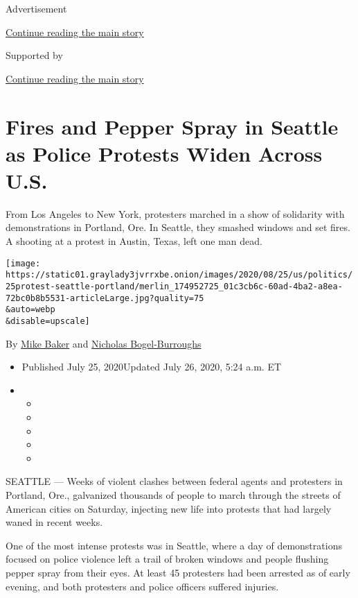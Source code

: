 Advertisement

\protect\hyperlink{after-top}{Continue reading the main story}

Supported by

\protect\hyperlink{after-sponsor}{Continue reading the main story}

\hypertarget{fires-and-pepper-spray-in-seattle-as-police-protests-widen-across-us}{%
\section{Fires and Pepper Spray in Seattle as Police Protests Widen
Across
U.S.}\label{fires-and-pepper-spray-in-seattle-as-police-protests-widen-across-us}}

From Los Angeles to New York, protesters marched in a show of solidarity
with demonstrations in Portland, Ore. In Seattle, they smashed windows
and set fires. A shooting at a protest in Austin, Texas, left one man
dead.

\texttt{[image: https://static01.graylady3jvrrxbe.onion/images/2020/08/25/us/politics/25protest-seattle-portland/merlin\_174952725\_01c3cb6c-60ad-4ba2-a8ea-72bc0b8b5531-articleLarge.jpg?quality=75\\\&auto=webp\\\&disable=upscale]}

By \href{https://www.nytimes3xbfgragh.onion/by/mike-baker}{Mike Baker}
and
\href{https://www.nytimes3xbfgragh.onion/by/nicholas-bogel-burroughs}{Nicholas
Bogel-Burroughs}

\begin{itemize}
\item
  Published July 25, 2020Updated July 26, 2020, 5:24 a.m. ET
\item
  \begin{itemize}
  \item
  \item
  \item
  \item
  \item
  \end{itemize}
\end{itemize}

SEATTLE --- Weeks of violent clashes between federal agents and
protesters in Portland, Ore., galvanized thousands of people to march
through the streets of American cities on Saturday, injecting new life
into protests that had largely waned in recent weeks.

One of the most intense protests was in Seattle, where a day of
demonstrations focused on police violence left a trail of broken windows
and people flushing pepper spray from their eyes. At least 45 protesters
had been arrested as of early evening, and both protesters and police
officers suffered injuries.

